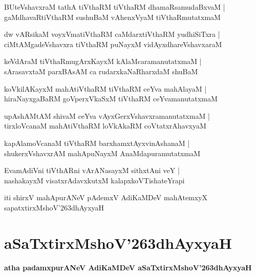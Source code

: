 \documentclass[twoside,12pt,openright]{book}
\def\S{\char'263}
\newcounter{shloka}[chapter]
\begin{document}
\begin{shloka}
BUteVshavxraM tathA tiVthaRM tiVthaRM  dhamaRsamudaBxvaM |\\
gaMdhavaRtiVthaRM sushuBaM vAhenxVyaM tiVthaRmutatxmaM 
\end{shloka}

\begin{shloka}
dw vARsikaM voyxVmatiVthaRM caMdarxtiVthaRM yudhiSiTxra |\\
ciMtAMgadeVshavxra tiVthaRM puNayxM vidAyxdhareVshavxaraM 
\end{shloka}

\begin{shloka}
keVdAraM tiVthaRmugArxKayxM kAlaMcaramanutatxmaM |\\
sArasavxtaM parxBAsAM ca rudarxkaNaRharxdaM shuBaM 
\end{shloka}

\begin{shloka}
koVkilAKayxM mahAtiVthaRM tiVthaRM ceYva mahAlayaM |\\
hiraNayxgaBaRM goVperxVkaSxM tiVthaRM ceYvamanutatxmaM 
\end{shloka}

\begin{shloka}
upAshAMtAM shivaM ceYva vAyxGerxVshavxramanutatxmaM |\\
tirxloVcanaM mahAtiVthaRM loVkAkaRM coVtatxrAhavxyaM 
\end{shloka}

\begin{shloka}
kapAlamoVcanaM tiVthaRM barxhamxtAyxvinAshanaM |\\
shukerxVshavxrAM mahApuNayxM AnaMdapuramutatxmaM 
\end{shloka}

\begin{shloka}
EvamAdiVni tiVthARni vArANasayxM sithxtAni veY |\\
nashakayxM visatxrAdavxkutxM kalapxkoVTishateYrapi
\end{shloka}

\begin{center}
iti shirxV mahApurANeV pAdemxV AdiKaMDeV mahAtemxyX sapatxtirxMshoV\S dhAyxyaH 
\end{center}


\chapter{aSaTxtirxMshoV\S dhAyxyaH}

\begin{center}
{\LARGE\bfseries atha padamxpurANeV AdiKaMDeV aSaTxtirxMshoV\S dhAyxyaH}
\end{center}
\end{document}
